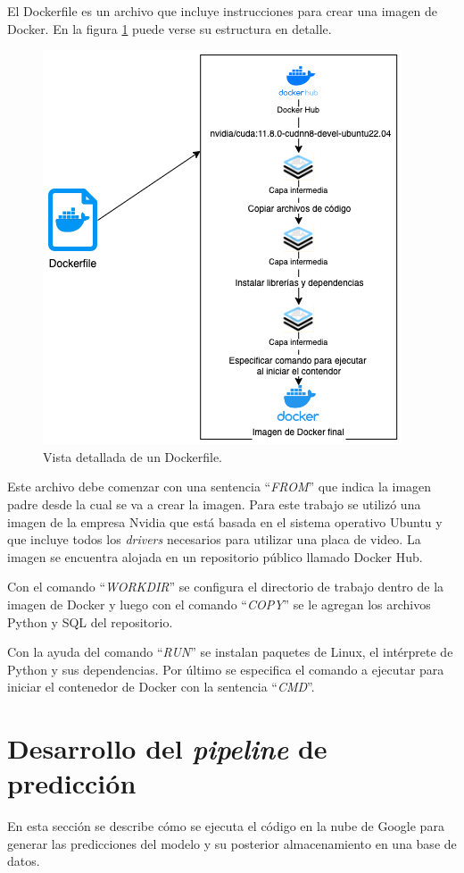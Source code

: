 El Dockerfile es un archivo que incluye instrucciones para crear una imagen de Docker. En la figura \ref{fig:cap3-docker-dockerfile} puede verse su estructura en detalle.

\begin{figure}[htbp]
	\centering
	\includegraphics[width=.6\textwidth]{./Figures/cap3-docker-dockerfile.png}
	\caption{Vista detallada de un Dockerfile.}
	\label{fig:cap3-docker-dockerfile}
\end{figure}

Este archivo debe comenzar con una sentencia ``\textit{FROM}'' que indica la imagen padre desde la cual se va a crear la imagen. Para este trabajo se utilizó una imagen de la empresa Nvidia que está basada en el sistema operativo Ubuntu y que incluye todos los \textit{drivers} necesarios para utilizar una placa de video. La imagen se encuentra alojada en un repositorio público llamado Docker Hub.

Con el comando ``\textit{WORKDIR}'' se configura el directorio de trabajo dentro de la imagen de Docker y luego con el comando ``\textit{COPY}'' se le agregan los archivos Python y SQL del repositorio.

Con la ayuda del comando ``\textit{RUN}'' se instalan paquetes de Linux, el intérprete de Python y sus dependencias. Por último se especifica el comando a ejecutar para iniciar el contenedor de Docker con la sentencia ``\textit{CMD}''.


\section{Desarrollo del \textit{pipeline} de predicción}

En esta sección se describe cómo se ejecuta el código en la nube de Google para generar las predicciones del modelo y su posterior almacenamiento en una base de datos.

